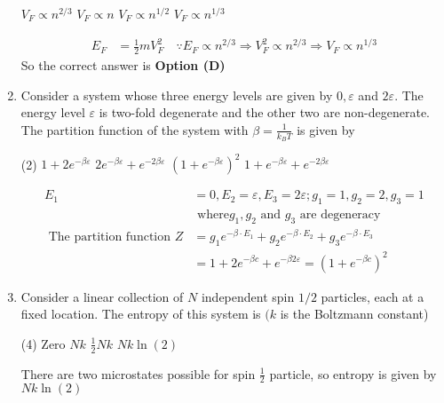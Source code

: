 \begin{enumerate}
\begin{tasks}
\task[\textbf{A.}] $V_{F} \propto n^{2 / 3}$
\task[\textbf{B.}]  $V_{F} \propto n$
\task[\textbf{C.}] $V_{F} \propto n^{1 / 2}$
\task[\textbf{D.}] $V_{F} \propto n^{1 / 3}$
\end{tasks}
\begin{answer}
\begin{align*}
E_{F}&=\frac{1}{2} m V_{F}^{2} \quad \because E_{F} \propto n^{2 / 3} \Rightarrow V_{F}^{2} \propto n^{2 / 3} \Rightarrow V_{F} \propto n^{1 / 3}
\end{align*}
So the correct answer is \textbf{Option (D)}
\end{answer}
	\item Consider a system whose three energy levels are given by $0, \varepsilon$ and $2 \varepsilon$. The energy level $\varepsilon$ is two-fold degenerate and the other two are non-degenerate. The partition function of the system with $\beta=\frac{1}{k_{B} T}$ is given by
\begin{tasks}(2)
\task[\textbf{A.}] $1+2 e^{-\beta \varepsilon}$
\task[\textbf{B.}] $2 e^{-\beta \varepsilon}+e^{-2 \beta \varepsilon}$
\task[\textbf{C.}] $\left(1+e^{-\beta \varepsilon}\right)^{2}$
\task[\textbf{D.}] $1+e^{-\beta \varepsilon}+e^{-2 \beta \varepsilon}$
\end{tasks}
\begin{answer}
\begin{align*}
E_{1}&=0, E_{2}=\varepsilon, E_{3}=2 \varepsilon ; g_{1}=1, g_{2}=2, g_{3}=1\\&\text{ where} g_{1}, g_{2}\text{ and }g_{3}\text{ are degeneracy}\\
\text{	The partition function }Z&=g_{1} e^{-\beta \cdot E_{1}}+g_{2} e^{-\beta \cdot E_{2}}+g_{3} e^{-\beta \cdot E_{3}}\\&=1+2 e^{-\beta c}+e^{-\beta 2 \varepsilon}=\left(1+e^{-\beta c}\right)^{2}
\end{align*}
\end{answer}
	\item Consider a linear collection of $N$ independent spin $1 / 2$ particles, each at a fixed location. The entropy of this system is $(k$ is the Boltzmann constant)
\begin{tasks}(4)
\task[\textbf{A.}] Zero
\task[\textbf{B.}]  $N k$
\task[\textbf{C.}]  $\frac{1}{2} N k$
\task[\textbf{D.}] $N k \ln (2)$
\end{tasks}
\begin{answer}
There are two microstates possible for spin $\frac{1}{2}$ particle, so entropy is given by $N k \ln (2)$\\\\

\end{answer}
\end{enumerate}
